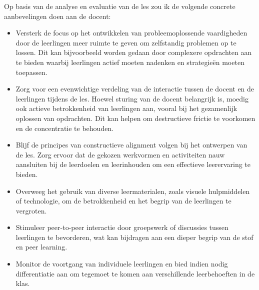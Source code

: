 \documentclass{article}
\begin{document}
                    Op basis van de analyse en evaluatie van de les zou ik de volgende concrete aanbevelingen doen aan de docent:
                    \begin{itemize}
                        \item Versterk de focus op het ontwikkelen van probleemoplossende vaardigheden door de leerlingen meer ruimte te geven om zelfstandig problemen op te lossen. Dit kan bijvoorbeeld worden gedaan door complexere opdrachten aan te bieden waarbij leerlingen actief moeten nadenken en strategieën moeten toepassen.
                        \item Zorg voor een evenwichtige verdeling van de interactie tussen de docent en de leerlingen tijdens de les. Hoewel sturing van de docent belangrijk is, moedig ook actieve betrokkenheid van leerlingen aan, vooral bij het gezamenlijk oplossen van opdrachten. Dit kan helpen om destructieve frictie te voorkomen en de concentratie te behouden.
                        \item Blijf de principes van constructieve alignment volgen bij het ontwerpen van de les. Zorg ervoor dat de gekozen werkvormen en activiteiten nauw aansluiten bij de leerdoelen en leerinhouden om een effectieve leerervaring te bieden.
                        \item Overweeg het gebruik van diverse leermaterialen, zoals visuele hulpmiddelen of technologie, om de betrokkenheid en het begrip van de leerlingen te vergroten.
                        \item Stimuleer peer-to-peer interactie door groepswerk of discussies tussen leerlingen te bevorderen, wat kan bijdragen aan een dieper begrip van de stof en peer learning.
                        \item Monitor de voortgang van individuele leerlingen en bied indien nodig differentiatie aan om tegemoet te komen aan verschillende leerbehoeften in de klas.
                    \end{itemize}
                \newpage
            
\end{document}
